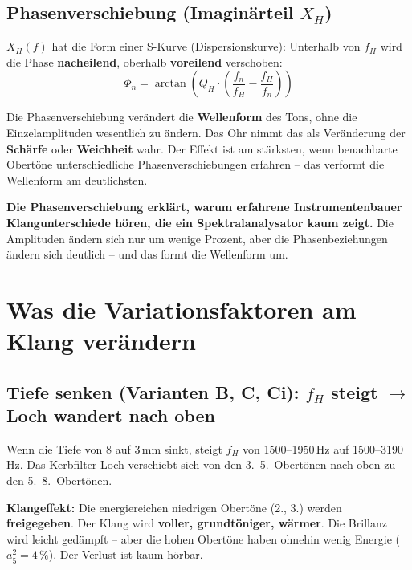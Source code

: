\documentclass[11pt,a4paper]{article}
\begin{document}
\subsection{Phasenverschiebung (Imaginärteil $X_H$)}

$X_H(f)$ hat die Form einer S-Kurve (Dispersionskurve): Unterhalb von $f_H$ wird die Phase \textbf{nacheilend}, oberhalb \textbf{voreilend} verschoben:
\begin{equation}
\Phi_n = \arctan\!\left(Q_H \cdot \left(\frac{f_n}{f_H} - \frac{f_H}{f_n}\right)\right)
\end{equation}

Die Phasenverschiebung verändert die \textbf{Wellenform} des Tons, ohne die Einzelamplituden wesentlich zu ändern. Das Ohr nimmt das als Veränderung der \textbf{Schärfe} oder \textbf{Weichheit} wahr. Der Effekt ist am stärksten, wenn benachbarte Obertöne unterschiedliche Phasenverschiebungen erfahren -- das verformt die Wellenform am deutlichsten.

\begin{warnbox}
\textbf{Die Phasenverschiebung erklärt, warum erfahrene Instrumentenbauer Klangunterschiede hören, die ein Spektralanalysator kaum zeigt.} Die Amplituden ändern sich nur um wenige Prozent, aber die Phasenbeziehungen ändern sich deutlich -- und das formt die Wellenform um.
\end{warnbox}


\section{Was die Variationsfaktoren am Klang verändern}

\subsection{Tiefe senken (Varianten B, C, Ci): $f_H$ steigt $\to$ Loch wandert nach oben}

Wenn die Tiefe von 8 auf 3\,mm sinkt, steigt $f_H$ von 1500--1950\,Hz auf 1500--3190\,Hz. Das Kerbfilter-Loch verschiebt sich von den 3.--5.~Obertönen nach oben zu den 5.--8.~Obertönen.

\textbf{Klangeffekt:} Die energiereichen niedrigen Obertöne (2., 3.) werden \textbf{freigegeben}. Der Klang wird \textbf{voller, grundtöniger, wärmer}. Die Brillanz wird leicht gedämpft -- aber die hohen Obertöne haben ohnehin wenig Energie ($a_5^2 = 4\,\%$). Der Verlust ist kaum hörbar.
\end{document}
